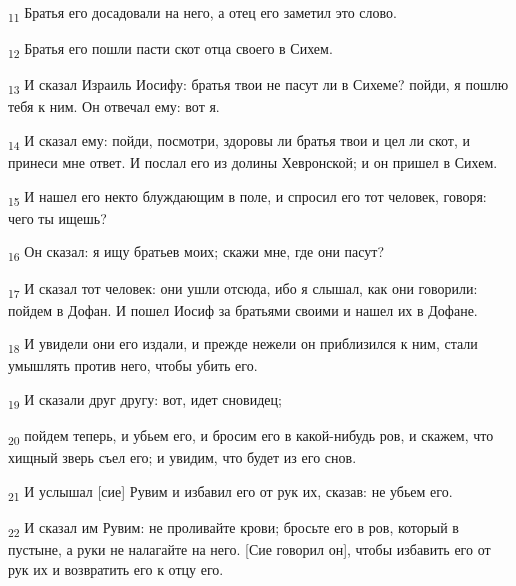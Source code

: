 \begin{tcolorbox}
\textsubscript{11} Братья его досадовали на него, а отец его заметил это слово.
\end{tcolorbox}
\begin{tcolorbox}
\textsubscript{12} Братья его пошли пасти скот отца своего в Сихем.
\end{tcolorbox}
\begin{tcolorbox}
\textsubscript{13} И сказал Израиль Иосифу: братья твои не пасут ли в Сихеме? пойди, я пошлю тебя к ним. Он отвечал ему: вот я.
\end{tcolorbox}
\begin{tcolorbox}
\textsubscript{14} И сказал ему: пойди, посмотри, здоровы ли братья твои и цел ли скот, и принеси мне ответ. И послал его из долины Хевронской; и он пришел в Сихем.
\end{tcolorbox}
\begin{tcolorbox}
\textsubscript{15} И нашел его некто блуждающим в поле, и спросил его тот человек, говоря: чего ты ищешь?
\end{tcolorbox}
\begin{tcolorbox}
\textsubscript{16} Он сказал: я ищу братьев моих; скажи мне, где они пасут?
\end{tcolorbox}
\begin{tcolorbox}
\textsubscript{17} И сказал тот человек: они ушли отсюда, ибо я слышал, как они говорили: пойдем в Дофан. И пошел Иосиф за братьями своими и нашел их в Дофане.
\end{tcolorbox}
\begin{tcolorbox}
\textsubscript{18} И увидели они его издали, и прежде нежели он приблизился к ним, стали умышлять против него, чтобы убить его.
\end{tcolorbox}
\begin{tcolorbox}
\textsubscript{19} И сказали друг другу: вот, идет сновидец;
\end{tcolorbox}
\begin{tcolorbox}
\textsubscript{20} пойдем теперь, и убьем его, и бросим его в какой-нибудь ров, и скажем, что хищный зверь съел его; и увидим, что будет из его снов.
\end{tcolorbox}
\begin{tcolorbox}
\textsubscript{21} И услышал [сие] Рувим и избавил его от рук их, сказав: не убьем его.
\end{tcolorbox}
\begin{tcolorbox}
\textsubscript{22} И сказал им Рувим: не проливайте крови; бросьте его в ров, который в пустыне, а руки не налагайте на него. [Сие говорил он], чтобы избавить его от рук их и возвратить его к отцу его.
\end{tcolorbox}
